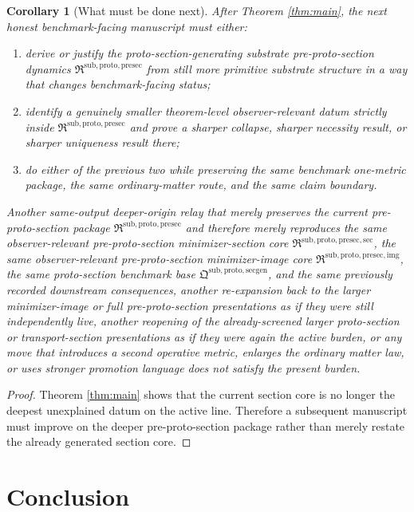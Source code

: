 \documentclass[11pt]{article}
\newcommand{\ProtoSectionPackage}{\mathfrak Q^{\mathrm{sub,proto,secgen}}}
\newcommand{\PreProtoSectionPackage}{\mathfrak R^{\mathrm{sub,proto,presec}}}
\newcommand{\PreProtoSectionImageCore}{\mathfrak R^{\mathrm{sub,proto,presec,img}}}
\newcommand{\PreProtoSectionMinSectionCore}{\mathfrak R^{\mathrm{sub,proto,presec,sec}}}
\newtheorem{corollary}{Corollary}
\begin{document}
\begin{corollary}[What must be done next]
\label{cor:next}
After Theorem \ref{thm:main}, the next honest benchmark-facing manuscript must either:
\begin{enumerate}
    \item derive or justify the proto-section-generating substrate pre-proto-section dynamics \(\PreProtoSectionPackage\) from still more primitive substrate structure in a way that changes benchmark-facing status;
    \item identify a genuinely smaller theorem-level observer-relevant datum strictly inside \(\PreProtoSectionPackage\) and prove a sharper collapse, sharper necessity result, or sharper uniqueness result there;
    \item do either of the previous two while preserving the same benchmark one-metric package, the same ordinary-matter route, and the same claim boundary.
\end{enumerate}
Another same-output deeper-origin relay that merely preserves the current pre-proto-section package \(\PreProtoSectionPackage\) and therefore merely reproduces the same observer-relevant pre-proto-section minimizer-section core \(\PreProtoSectionMinSectionCore\), the same observer-relevant pre-proto-section minimizer-image core \(\PreProtoSectionImageCore\), the same proto-section benchmark base \(\ProtoSectionPackage\), and the same previously recorded downstream consequences, another re-expansion back to the larger minimizer-image or full pre-proto-section presentations as if they were still independently live, another reopening of the already-screened larger proto-section or transport-section presentations as if they were again the active burden, or any move that introduces a second operative metric, enlarges the ordinary matter law, or uses stronger promotion language does not satisfy the present burden.
\end{corollary}

\begin{proof}
Theorem \ref{thm:main} shows that the current section core is no longer the deepest unexplained datum on the active line. Therefore a subsequent manuscript must improve on the deeper pre-proto-section package rather than merely restate the already generated section core.
\end{proof}

\section{Conclusion}
\end{document}
